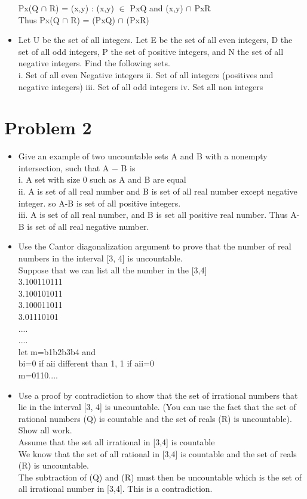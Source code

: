 \documentclass[12pt,letterpaper]{article}
\begin{document}
\begin{itemize}
        Px(Q \(\cap\) R) = {(x,y) : (x,y) \(\in\) PxQ and (x,y) \(\cap\) PxR}\\
        Thus  Px(Q \(\cap\) R) = (PxQ) \(\cap\) (PxR)
  \item Let U be the set of all integers. Let E be the set of all even integers, D the set of all odd integers,
        P the set of positive integers, and N the set of all negative integers. Find the following sets.\\
        i. Set of all even Negative integers
        ii. Set of all integers (positives and negative integers)
        iii. Set of all odd integers
        iv. Set all non integers
\end{itemize}
\section*{Problem 2}
\begin{itemize}
  \item Give an example of two uncountable sets A and B with a nonempty intersection, such that A − B
        is\\
        i. A set with size 0 such as A and B are equal\\
        ii.  A is set of all real number and B is set of all real number except negative integer. so A-B is
        set of all positive integers.\\
        iii.  A is set of all real number, and B is set all positive real number. Thus A-B is set of all
        real negative number.
  \item Use the Cantor diagonalization argument to prove that the number of real numbers in the interval
          [3, 4] is uncountable.\\
        Suppose that we can list all the number in the [3,4]\\
        3.100110111\\
        3.100101011\\
        3.100011011\\
        3.01110101\\
        ....\\
        ....\\
        let m=b1b2b3b4 and\\
        bi={0 if aii different than 1, 1 if aii=0}\\
        m=0110....\\
  \item Use a proof by contradiction to show that the set of irrational numbers that lie in the interval
          [3, 4] is uncountable. (You can use the fact that the set of rational numbers (Q) is countable and
        the set of reals (R) is uncountable). Show all work.\\
        Assume that the set all irrational in [3,4] is countable\\
        We know that the set of all rational in [3,4] is countable and the set of reals (R) is uncountable.\\
        The subtraction of (Q) and (R) must then be uncountable which is the set
        of all irrational number in [3,4]. This is a contradiction.
\end{itemize}
\end{document}
